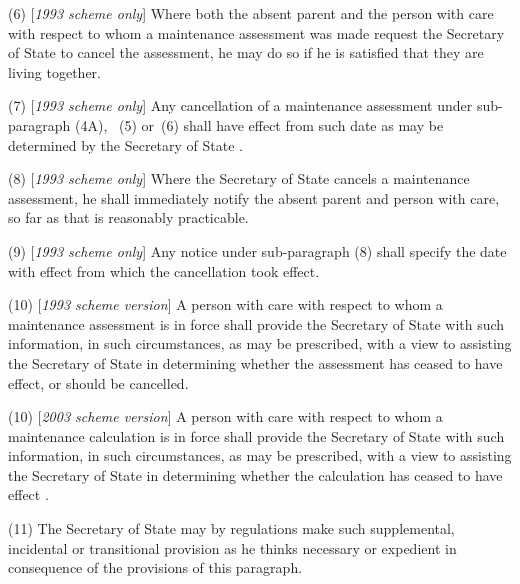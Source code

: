 \documentclass[12pt,a4paper]{article}
\begin{document}
(6) [\emph{1993 scheme only}] Where both the absent parent and the person with care with respect to whom a maintenance assessment was made request 
the Secretary of State  %
to cancel the assessment, he may do so if he is satisfied that they are living together.

(7) [\emph{1993 scheme only}] Any cancellation of a maintenance assessment under sub-paragraph 
(4A),~%
(5)  or~(6)  shall have effect from such date as may be determined by 
the Secretary of State%
.

(8) [\emph{1993 scheme only}] Where 
the Secretary of State  %
cancels a maintenance assessment, he shall immediately notify the absent parent and person with care, so far as that is reasonably practicable.

(9) [\emph{1993 scheme only}] Any notice under sub-paragraph (8)  shall specify the date with effect from which the cancellation took effect.

(10) [\emph{1993 scheme version}] A person with care with respect to whom a maintenance assessment is in force shall provide the Secretary of State with such information, in such circumstances, as may be prescribed, with a view to assisting the Secretary of State 
in determining whether the assessment has ceased to have effect, or should be cancelled.

(10) [\emph{2003 scheme version}] A person with care with respect to whom a 
maintenance calculation  %
is in force shall provide the Secretary of State with such information, in such circumstances, as may be prescribed, with a view to assisting the Secretary of State 
in determining whether the 
calculation  %
has ceased to have effect%
.

(11) The Secretary of State may by regulations make such supplemental, incidental or transitional provision as he thinks necessary or expedient in consequence of the provisions of this paragraph.
\end{document}
